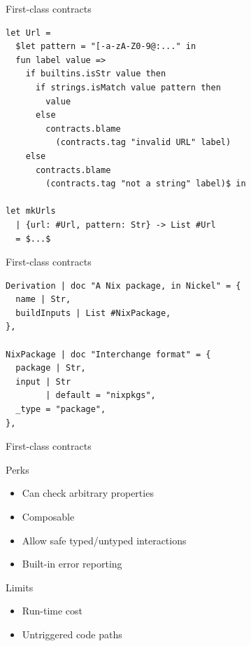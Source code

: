 \documentclass[t, aspectratio=169]{beamer}
\begin{document}
\begin{frame}[fragile]{First-class contracts}
\begin{lstlisting}[language=Nickel]
let Url =
  $let pattern = "[-a-zA-Z0-9@:..." in
  fun label value =>
    if builtins.isStr value then
      if strings.isMatch value pattern then
        value
      else
        contracts.blame
          (contracts.tag "invalid URL" label)
    else
      contracts.blame
        (contracts.tag "not a string" label)$ in

let mkUrls
  | {url: #Url, pattern: Str} -> List #Url
  = $...$
\end{lstlisting}
\end{frame}

\begin{frame}[fragile]{First-class contracts}
\begin{lstlisting}[language=Nickel]
Derivation | doc "A Nix package, in Nickel" = {
  name | Str,
  buildInputs | List #NixPackage,
},

NixPackage | doc "Interchange format" = {
  package | Str,
  input | Str
        | default = "nixpkgs",
  _type = "package",
},
\end{lstlisting}
\end{frame}

%

\begin{frame}{First-class contracts}
    \begin{exampleblock}{Perks}
        \begin{itemize}
            \item Can check arbitrary properties
            \item Composable
            \item Allow safe typed/untyped interactions
            \item Built-in error reporting
        \end{itemize}
    \end{exampleblock}

    \begin{alertblock}{Limits}
        \begin{itemize}
            \item Run-time cost
            \item Untriggered code paths
        \end{itemize}
    \end{alertblock}
\end{frame}
\end{document}
